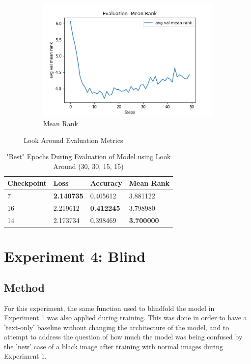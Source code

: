 \begin{figure}[H]
\begin{subfigure}[b]{0.3\textwidth}
         \includegraphics[width=\textwidth]{./figure/results/look_around/eval/avg val mean rank.png}
         \caption{Mean Rank}
         \label{fig:la_e_mean_rank}
     \end{subfigure}
     \caption{Look Around Evaluation Metrics}
     \label{fig:la_e_metrics}
\end{figure}

\begin{table}[H]
\centering
\caption{"Best" Epochs During Evaluation of Model using Look Around (30, 30, 15, 15)}
\begin{tabular}{l | l | l | l}
Checkpoint & Loss & Accuracy & Mean Rank \\
\hline
7 & \textbf{2.140735} & 0.405612 & 3.881122 \\
16 & 2.219612 & \textbf{0.412245} & 3.798980 \\
14 & 2.173734 & 0.398469 & \textbf{3.700000} 
\end{tabular}
\label{tab:best_look_around}
\end{table}

\section{Experiment 4: Blind}
\label{sec:exp_4}
\subsection{Method}
For this experiment, the same function used to blindfold the model in Experiment 1 was also applied during training. This was done in order to have a 'text-only' baseline without changing the architecture of the model, and to attempt to address the question of how much the model was being confused by the 'new' case of a black image after training with normal images during Experiment 1. 

